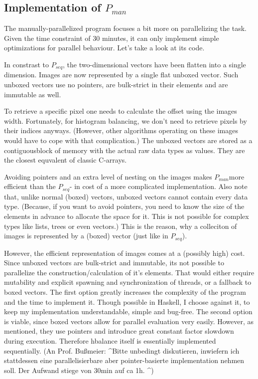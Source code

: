 \documentclass{article}
\newcommand{\seq}[0]{$P_{seq}$}
\newcommand{\man}[0]{$P_{man}$}
\begin{document}
    \newpage
    \subsection{Implementation of \man}
      The manually-parallelized program focuses a bit more on parallelizing
      the task. Given the time constraint of 30 minutes, it can only implement
      simple optimizations for parallel behaviour. Let's take a look at its code.      
      
      
      
      In constrast to \seq, the two-dimensional vectors have been
      flatten into a single dimension. Images are now represented
      by a single flat unboxed vector. Such unboxed vectors use no pointers,
      are bulk-strict in their elements and are immutable as well.
      
      To retrieve a specific pixel one needs to calculate
      the offset using the images width. Fortunately,
      for histogram balancing, we don't need to retrieve pixels by their indices anyways.
      (However, other algorithms operating on these images would have to cope with that complication.)
      The unboxed vectors are stored as a contiguousblock of memory with
      the actual raw data types as values. They are the closest equvalent of classic C-arrays.
      
      Avoiding pointers and an extra level of nesting on the images 
      makes \man more efficient than the \seq - in cost of a more complicated implementation.
      Also note that, unlike normal (boxed) vectors,
      unboxed vectors cannot contain every data type.
      (Because, if you want to avoid pointers, you need to know the size of the
      elements in advance to allocate the space for it. This is not possible for complex
      types like lists, trees or even vectors.)
      This is the reason, why a colleciton of images is represented by a
      (boxed) vector (just like in \seq).
      
      However, the efficient representation of images comes at a (possibly high) cost.
      Since unboxed vectors are bulk-strict and immutable,
      its not possible to parallelize the construction/calculation of it's elements.
      That would either require mutability and explicit spawning and synchronization of threads,
      or a fallback to boxed vectors.
      The first option greatly increases the complexity of the program
      and the time to implement it. Though possible in Haskell, I choose
      against it, to keep my implementation understandable, simple and bug-free.
      The second option is viable, since boxed vectors allow for parallel
      evaluation very easily. However, as mentioned, they use pointers and introduce great constant factor slowdown during execution.
      Therefore hbalance itself is essentially implemented sequentially.
      (An Prof. Bußmeier: \textasciicircum Bitte unbedingt diskutieren, inwiefern ich stattdessen eine parallelisierbare aber pointer-basierte implementation nehmen soll. Der Aufwand stiege von 30min auf ca 1h. \textasciicircum )
      
\end{document}
